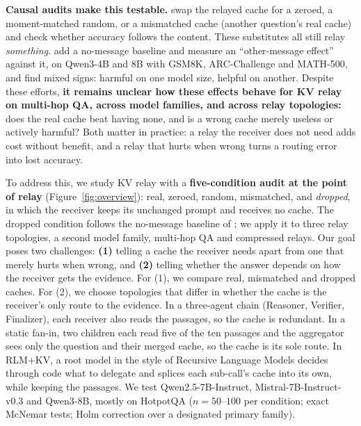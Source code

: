\documentclass[11pt]{article}
\begin{document}
\textbf{Causal audits make this testable.} \citet{latentcommpay2026} swap the
relayed cache for a zeroed, a moment-matched random, or a mismatched cache (another
question's real cache) and check whether accuracy follows the content. These
substitutes all still relay \emph{something}. \citet{zhangemu2026} add a no-message
baseline and measure an ``other-message effect'' against it, on Qwen3-4B and 8B with
GSM8K, ARC-Challenge and MATH-500, and find mixed signs: harmful on one model size,
helpful on another. Despite these efforts, \textbf{it remains unclear how these
effects behave for KV relay on multi-hop QA, across model families, and across relay
topologies:} does the real cache beat having none, and is a wrong cache merely
useless or actively harmful? Both matter in practice: a relay the receiver does not
need adds cost without benefit, and a relay that hurts when wrong turns a routing
error into lost accuracy.

To address this, we study KV relay with a \textbf{five-condition audit at the point
of relay} (Figure~\ref{fig:overview}): real, zeroed, random, mismatched, and
\emph{dropped}, in which the receiver keeps its unchanged prompt and receives no
cache. The dropped condition follows the no-message baseline of
\citet{zhangemu2026}; we apply it to three relay topologies, a second model family,
multi-hop QA and compressed relays. Our goal poses two challenges: \textbf{(1)}
telling a cache the receiver needs apart from one that merely hurts when wrong, and
\textbf{(2)} telling whether the answer depends on how the receiver gets the
evidence. For (1), we compare real, mismatched and dropped caches. For (2), we
choose topologies that differ in whether the cache is the receiver's only route to
the evidence. In a three-agent chain (Reasoner, Verifier, Finalizer), each receiver
also reads the passages, so the cache is redundant. In a static fan-in, two children
each read five of the ten passages and the aggregator sees only the question and
their merged cache, so the cache is its sole route. In RLM+KV, a root model in the
style of Recursive Language Models \citep{rlm2026} decides through code what to
delegate and splices each sub-call's cache into its own, while keeping the passages.
We test Qwen2.5-7B-Instruct, Mistral-7B-Instruct-v0.3 and Qwen3-8B, mostly on
HotpotQA \citep{hotpotqa2018} ($n{=}50$--$100$ per condition; exact McNemar tests;
Holm correction over a designated primary family).
\end{document}
